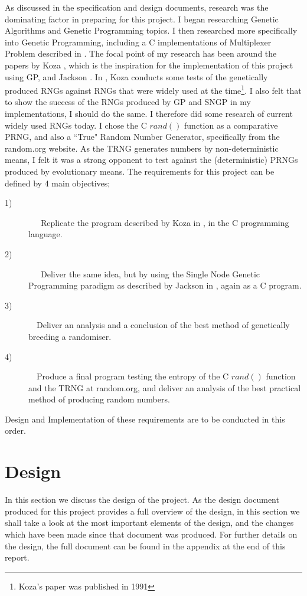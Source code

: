 \documentclass[a4paper,10.5pt]{article}
\begin{document}
As discussed in the specification and design documents, research was the dominating factor in preparing for this project. I began researching Genetic Algorithms \cite[p.1 - 24]{mitchell} and Genetic Programming \cite[p.1 - 35]{introgp} \cite[p.73 - 191]{kozagpbook} topics. I then researched more specifically into Genetic Programming, including a C implementations of Multiplexer Problem described in \cite{kozamux}. The focal point of my research has been around the papers by Koza \cite{kozarng}, which is the inspiration for the implementation of this project using GP, and Jackson \cite{jacksonsngp2}. In \cite{kozarng}, Koza conducts some tests of the genetically produced RNGs against RNGs that were widely used at the time\footnote{Koza's paper was published in 1991}. I also felt that to show the success of the RNGs produced by GP and SNGP in my implementations, I should do the same. I therefore did some research of current widely used RNGs today. I chose the C $rand()$ function as a comparative PRNG, and also a ``True" Random Number Generator, specifically from the random.org website. As the TRNG generates numbers by non-deterministic means, I felt it was a strong opponent to test against the (deterministic) PRNGs produced by evolutionary means.
The requirements for this project can be defined by 4 main objectives;
\begin{description}
  \item[1)]
  \ \ \ Replicate the program described by Koza in \cite{kozarng}, in the C programming language. 
  \item[2)]
 \ \ \ Deliver the same idea, but by using the Single Node Genetic Programming paradigm as described by Jackson in \cite{jacksonsngp2}, again as a C program.
  \item[3)]
  \ \  Deliver an analysis and a conclusion of the best method of genetically breeding a randomiser.
   \item[4)]
  \ \  Produce a final program testing the entropy of the C $rand()$ function and the TRNG at random.org, and deliver an analysis of the best practical method of producing random numbers.
\end{description}
Design and Implementation of these requirements are to be conducted in this order. 
\newpage
\section{Design}

\label{design}
In this section we discuss the design of the project. As the design document produced for this project provides a full overview of the design, in this section we shall take a look at the most important elements of the design, and the changes which have been made since that document was produced. For further details on the design, the full document can be found in the appendix at the end of this report. 
\end{document}
